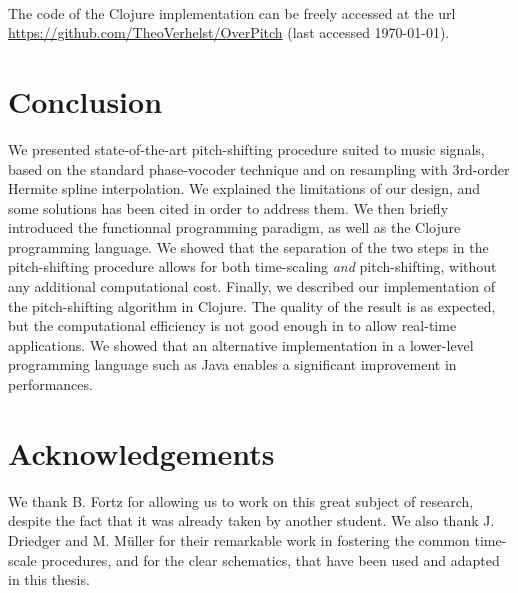 \documentclass[letterpaper]{article}
\theoremstyle{definition}
\theoremstyle{remark}
\begin{document}
\paragraph{}
The code of the Clojure implementation can be freely accessed at the url
\url{https://github.com/TheoVerhelst/OverPitch} (last accessed \today).

\section{Conclusion}
We presented state-of-the-art pitch-shifting procedure suited to music signals,
based on the standard phase-vocoder technique and on resampling with 3rd-order
Hermite spline interpolation. We explained the limitations of our design, and
some solutions has been cited in order to address them. We then briefly
introduced the functionnal programming paradigm, as well as the Clojure
programming language. We showed that the separation of the two steps in the
pitch-shifting procedure allows for both time-scaling \emph{and} pitch-shifting,
without any additional computational cost. Finally, we described our
implementation of the pitch-shifting algorithm in Clojure. The quality of the
result is as expected, but the computational efficiency is not good enough in to
allow real-time applications. We showed that an alternative implementation in a
lower-level programming language such as Java enables a significant improvement
in performances.

\section{Acknowledgements}
We thank B. Fortz for allowing us to work on this great subject of research,
despite the fact that it was already taken by another student. We also thank J.
Driedger and M. Müller for their remarkable work in fostering the common
time-scale procedures, and for the clear schematics, that have been used and
adapted in this thesis.

\footnotesize


\end{document}
